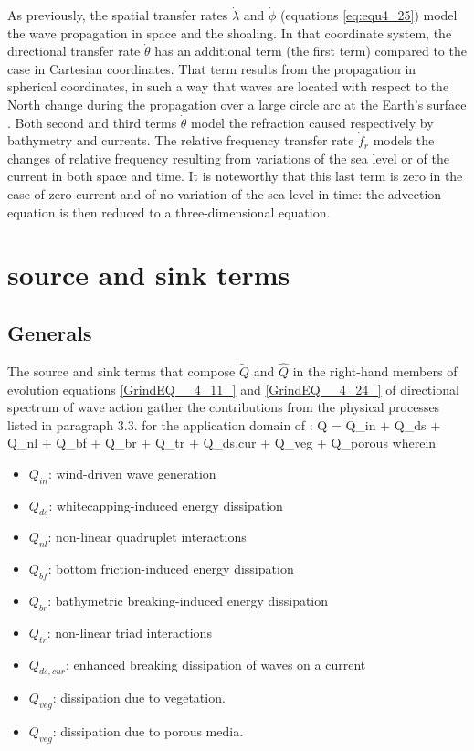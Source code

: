  As previously, the spatial transfer rates $\dot{\lambda }$ and $\dot{\phi }$ (equations \ref{eq:equ4_25}) model the wave propagation in space and the shoaling. In that coordinate system, the directional transfer rate $\dot{\theta }$ has an additional term (the first term) compared to the case in Cartesian coordinates. That term results from the propagation in spherical coordinates, in such a way that waves are located with respect to the North change during the propagation over a large circle arc at the Earth's surface \cite{Wamdi1988} \cite{Komen1994}. Both second and third terms $\dot{\theta }$ model the refraction caused respectively by bathymetry and currents. The relative frequency transfer rate $\dot{f}_{r} $  models the changes of relative frequency resulting from variations of the sea level or of the current in both space and time. It is noteworthy that this last term is zero in the case of zero current and of no variation of the sea level in time: the advection equation is then reduced to a three-dimensional equation.


\section{ \tomawac source and sink terms}
\label{se:sourceterm}

\subsection{ Generals}

 The source and sink terms that compose $\tilde{Q}$ and $\hat{Q}$ in the right-hand members of evolution equations \eqref{GrindEQ__4_11_} and \eqref{GrindEQ__4_24_} of directional spectrum of wave action gather the contributions from the physical processes listed in paragraph 3.3. for the application domain of \tomawac:
\bequ
\label{eq:semimp}
 Q = Q_{in} + Q_{ds} + Q_{nl} + Q_{bf} + Q_{br} + Q_{tr} + Q_{ds,cur} + Q_{veg} + Q_{porous}
\eequ
 wherein 
\begin{itemize}
\item $Q_{in}$: wind-driven wave generation
\item $Q_{ds}$: whitecapping-induced energy dissipation
\item $Q_{nl}$: non-linear quadruplet interactions
\item $Q_{bf}$: bottom friction-induced energy dissipation
\item $Q_{br}$: bathymetric breaking-induced energy dissipation
\item $Q_{tr}$: non-linear triad interactions
\item $Q_{ds,cur}$: enhanced breaking dissipation of waves on a current
\item $Q_{veg}$: dissipation due to vegetation.
\item $Q_{veg}$: dissipation due to porous media.
\end{itemize}

